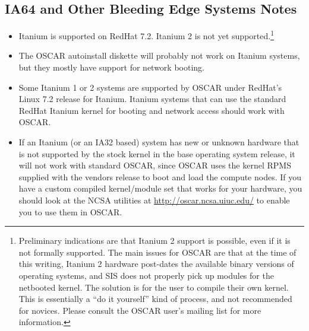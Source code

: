 
\subsection{IA64 and Other Bleeding Edge Systems Notes}
\label{subsec:ia64notes}

\begin{itemize}
  
\item Itanium is supported on RedHat 7.2.  Itanium 2 is not yet
  supported.\footnote{Preliminary indications are that Itanium 2
    support is possible, even if it is not formally supported.  The
    main issues for OSCAR are that at the time of this writing,
    Itanium 2 hardware post-dates the available binary versions of
    operating systems, and SIS does not properly pick up modules for
    the netbooted kernel.  The solution is for the user to compile
    their own kernel.  This is essentially a ``do it yourself'' kind
    of process, and not recommended for novices.  Please consult the
    OSCAR user's mailing list for more information.}

\item The OSCAR autoinstall diskette will probably not work on Itanium
  systems, but they mostly have support for network booting.
  
\item Some Itanium 1 or 2 systems are supported by OSCAR under
  RedHat's Linux 7.2 release for Itanium.  Itanium systems that can
  use the standard RedHat Itanium kernel for booting and network
  access should work with OSCAR.
  
\item If an Itanium (or an IA32 based) system has new or unknown
  hardware that is not supported by the stock kernel in the base
  operating system release, it will not work with standard OSCAR,
  since OSCAR uses the kernel RPMS supplied with the vendors release
  to boot and load the compute nodes.  If you have a custom compiled
  kernel/module set that works for your hardware, you should look at
  the NCSA utilities at \url{http://oscar.ncsa.uiuc.edu/} to
  enable you to use them in OSCAR.
\end{itemize}

